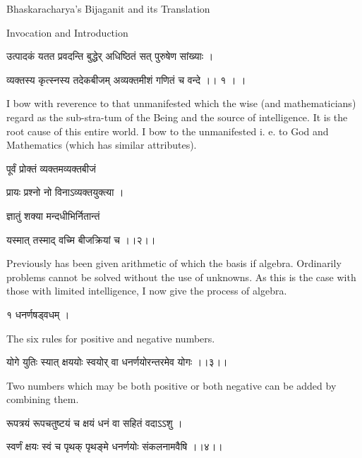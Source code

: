 \documentclass[]{article}
\date{}
\begin{document}
{Bhaskaracharya's Bijaganit and its Translation}

{Invocation and Introduction}

{उत्पादकं यतत प्रवदन्ति बुद्धेर् अधिष्ठितं सत् पुरुषेण सांख्याः । }

{ व्यक्तस्य कृत्स्नस्य तदेकबीजम् अव्यक्तमीशं गणितं च वन्दे ।। १ । । }

{I bow with reverence to that unmanifested which the wise (and
mathematicians) regard as the sub-stra-tum of the Being and the source
of intelligence. It is the root cause of this entire world. I bow to the
unmanifested i. e. to God and Mathematics (which has similar
attributes).}

{पूर्वं प्रोक्तं व्यक्तमव्यक्तबीजं }

{प्रायः प्रश्नो नो विनाऽव्यक्तयुक्त्या । }

{ज्ञातुं शक्या मन्दधीभिर्नितान्तं }

{यस्मात् तस्माद् वच्मि बीजक्रियां च ।।२।। }

{Previously has been given arithmetic of which the basis if algebra.
Ordinarily problems cannot be solved without the use of unknowns. As
this is the case with those with limited intelligence, I now give the
process of algebra.}

{ }

{१ धनर्णषड्वधम् । }

{The six rules for positive and negative numbers.}

{योगे युतिः स्यात् क्षययोः स्वयोर् वा धनर्णयोरन्तरमेव योगः ।।३।। }

{Two numbers which may be both positive or both negative can be added by
combining them.}

{रूपत्रयं रूपचतुष्टयं च क्षयं धनं वा सहितं वदाऽऽशु । }

{स्वर्णं क्षयः स्वं च पृथक् पृथङ्मे धनर्णयोः संकलनामवैषि ।।४।।}{\\
}
\end{document}
